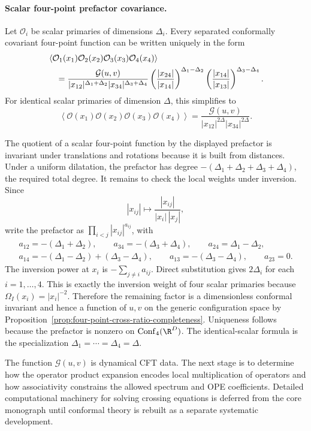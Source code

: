 \paragraph{Scalar four-point prefactor covariance.}
Let \(\mathcal O_i\) be scalar primaries of dimensions \(\Delta_i\).  Every
separated conformally covariant four-point function can be written uniquely in
the form
\begin{align}
  &\left\langle
    \mathcal O_1(x_1)\mathcal O_2(x_2)
    \mathcal O_3(x_3)\mathcal O_4(x_4)
  \right\rangle
  \notag\\
  &\quad =
  \frac{\mathcal G(u,v)}
  {|x_{12}|^{\Delta_1+\Delta_2}
   |x_{34}|^{\Delta_3+\Delta_4}}
  \left(\frac{|x_{24}|}{|x_{14}|}\right)^{\Delta_1-\Delta_2}
  \left(\frac{|x_{14}|}{|x_{13}|}\right)^{\Delta_3-\Delta_4}.
  \label{eq:scalar-four-point-general}
\end{align}
For identical scalar primaries of dimension \(\Delta\), this simplifies to
\begin{equation}
  \left\langle
    \mathcal O(x_1)\mathcal O(x_2)
    \mathcal O(x_3)\mathcal O(x_4)
  \right\rangle
  =
  \frac{\mathcal G(u,v)}
       {|x_{12}|^{2\Delta}|x_{34}|^{2\Delta}}.
  \label{eq:identical-scalar-four-point}
\end{equation}

The quotient of a scalar four-point function by the displayed prefactor is
invariant under translations and rotations because it is built from
distances.  Under a uniform dilatation, the prefactor has degree
\(-(\Delta_1+\Delta_2+\Delta_3+\Delta_4)\), the required total degree.  It
remains to check the local weights under inversion.  Since
\[
  |x_{ij}|\longmapsto \frac{|x_{ij}|}{|x_i|\,|x_j|},
\]
write the prefactor as \(\prod_{i<j}|x_{ij}|^{a_{ij}}\), with
\[
\begin{gathered}
  a_{12}=-(\Delta_1+\Delta_2),
  \qquad
  a_{34}=-(\Delta_3+\Delta_4),
  \qquad
  a_{24}=\Delta_1-\Delta_2,\\
  a_{14}=-(\Delta_1-\Delta_2)+(\Delta_3-\Delta_4),
  \qquad
  a_{13}=-(\Delta_3-\Delta_4),
  \qquad
  a_{23}=0 .
\end{gathered}
\]
The inversion power at \(x_i\) is \(-\sum_{j\ne i}a_{ij}\).  Direct
substitution gives \(2\Delta_i\) for each \(i=1,\ldots,4\).  This is exactly
the inversion weight of four scalar primaries because
\(\Omega_I(x_i)=|x_i|^{-2}\).  Therefore the remaining factor is a
dimensionless conformal invariant and hence a function of \(u,v\) on the
generic configuration space by
Proposition~\ref{prop:four-point-cross-ratio-completeness}.  Uniqueness follows
because the prefactor is nonzero on \(\operatorname{Conf}_4(\R^D)\).  The
identical-scalar formula is the specialization
\(\Delta_1=\cdots=\Delta_4=\Delta\).

The function \(\mathcal G(u,v)\) is dynamical CFT data.  The next stage is to
determine how the operator product expansion encodes local multiplication of
operators and how associativity constrains the allowed spectrum and OPE
coefficients.  Detailed computational machinery for solving crossing equations
is deferred from the core monograph until conformal theory is rebuilt as a
separate systematic development.
